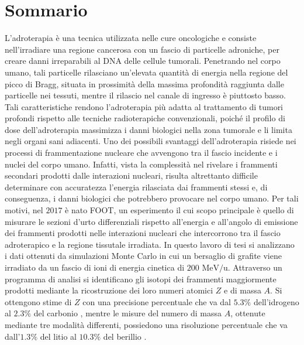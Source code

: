 \documentclass[12pt,a4paper,twoside]{report}
\begin{document}
	\chapter*{Sommario}
	L'adroterapia è una tecnica utilizzata nelle cure oncologiche e consiste nell'irradiare una regione cancerosa con un fascio di particelle adroniche, per creare danni irreparabili al DNA delle cellule tumorali. Penetrando nel corpo umano, tali particelle rilasciano un'elevata quantità di energia nella regione del picco di Bragg, situata in prossimità della massima profondità raggiunta dalle particelle nei tessuti, mentre il rilascio nel canale di ingresso è piuttosto basso. Tali caratteristiche rendono l'adroterapia più adatta al trattamento di tumori profondi rispetto alle tecniche radioterapiche convenzionali, poiché il profilo di dose dell'adroterapia massimizza i danni biologici nella zona tumorale e li limita negli organi sani adiacenti. Uno dei possibili svantaggi dell'adroterapia risiede nei processi di frammentazione nucleare che avvengono tra il fascio incidente e i nuclei del corpo umano. Infatti, vista la complessità nel rivelare i frammenti secondari prodotti dalle interazioni nucleari, risulta altrettanto difficile determinare con accuratezza l'energia rilasciata dai frammenti stessi e, di conseguenza, i danni biologici che potrebbero provocare nel corpo umano. Per tali motivi, nel $2017$ è nato FOOT, un esperimento il cui scopo principale è quello di misurare le sezioni d'urto differenziali rispetto all'energia e all'angolo di emissione dei frammenti prodotti nelle interazioni nucleari che intercorrono tra il fascio adroterapico e la regione tissutale irradiata. In questo lavoro di tesi si analizzano i dati ottenuti da simulazioni Monte Carlo in cui un bersaglio di grafite viene irradiato da un fascio di ioni  di energia cinetica di $200 \mbox{ MeV/u}$. Attraverso un programma di analisi si identificano gli isotopi dei frammenti maggiormente prodotti mediante la ricostruzione dei loro numeri atomici $Z$ e di massa $A$. Si ottengono stime di $Z$ con una precisione percentuale che va dal $5.3\%$ dell'idrogeno  al $2.3\%$ del carbonio , mentre le misure del numero di massa $A$, ottenute mediante tre modalità differenti, possiedono una risoluzione percentuale che va dall'$1.3\%$ del litio  al $10.3\%$ del berillio .
	\newpage
	\tableofcontents
	\newpage
\end{document}
